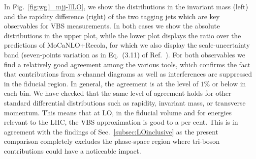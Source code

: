\documentclass[twocolumn,epjc3]{svjour3} %
\begin{document}
    In Fig.~\ref{fig:wg1_mjj-llLO}, we show the distributions in the invariant mass (left) and the rapidity difference (right) of the two tagging jets which are key observables for VBS measurements.
    In both cases we show the absolute distributions in the upper plot, while the lower plot displays the ratio over the predictions of {\sc MoCaNLO+Recola}, 
    for which we also display the scale-uncertainty band (seven-points variation as in Eq.~(3.11) of Ref.~\cite{Biedermann:2017bss}).
    For both observables we find a relatively good agreement among the various tools, which confirms the fact that contributions from $s$-channel diagrams as well as interferences are suppressed in the fiducial region.
    In general, the agreement is at the level of $1\%$ or below in each bin.
    We have checked that the same level of agreement holds for other standard differential distributions such as rapidity, invariant mass, or transverse momentum.
    This means that at LO, in the fiducial volume and for energies relevant to the LHC, the VBS approximation is good to a per cent.
    This is in agreement with the findings of Sec.~\ref{subsec:LOinclusive} as the present comparison completely excludes the phase-space region where tri-boson contributions could have a noticeable impact.
\end{document}
